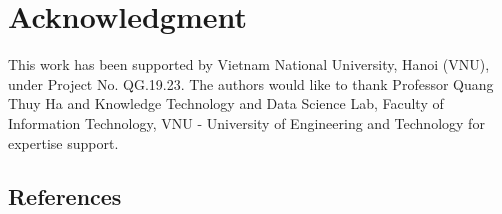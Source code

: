 \documentclass[]{iosart2c}
\begin{document}
    \section{Acknowledgment}

    This work has been supported by Vietnam National University, Hanoi (VNU), under Project No. QG.19.23. The authors would like to thank Professor Quang Thuy Ha and Knowledge Technology and Data Science Lab, Faculty of Information Technology, VNU - University of Engineering and Technology for expertise support.

    \subsection{References}

    
\end{document}
